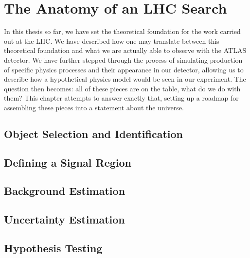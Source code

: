 \chapter{The Anatomy of an LHC Search}
In this thesis so far, we have set the theoretical foundation for the work 
carried out at the LHC. We have described how one may translate between this 
theoretical foundation and what we are actually able to observe with the ATLAS 
detector. We have further stepped through the process of simulating production of 
specific physics processes and their appearance in our detector, allowing us to 
describe how a hypothetical physics model would be seen in our experiment. The question 
then becomes: all of these pieces are on the table, what do we do with them? This chapter
attempts to answer exactly that, setting up a roadmap for assembling these pieces into 
a statement about the universe.

\section{Object Selection and Identification}
\section{Defining a Signal Region}
\section{Background Estimation}
\section{Uncertainty Estimation}
\section{Hypothesis Testing}